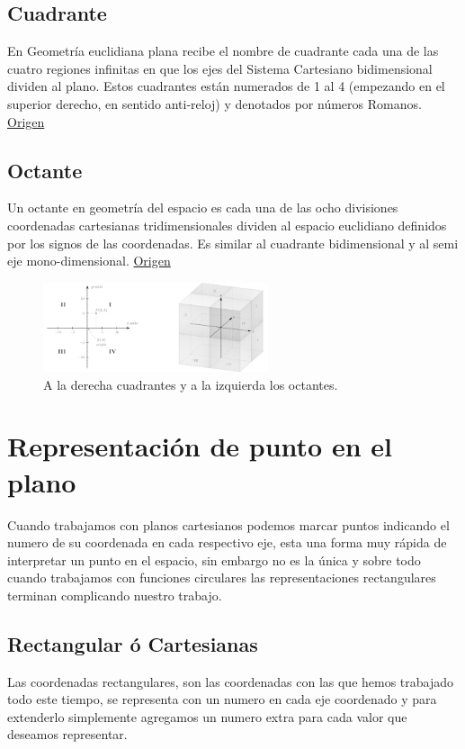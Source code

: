 \documentclass{article}
\begin{document}
\subsection{Cuadrante}
\label{sec:orge1b7409}
En Geometría euclidiana plana recibe el nombre de cuadrante cada una de las cuatro regiones infinitas en que los ejes del Sistema Cartesiano bidimensional dividen al plano. Estos cuadrantes están numerados de 1 al 4 (empezando en el superior derecho, en sentido anti-reloj) y denotados por números Romanos. \href{https://es.wikipedia.org/wiki/Cuadrante\_(geometr\%C3\%ADa)}{Origen}

\subsection{Octante}
\label{sec:orgcf0d150}
Un octante en geometría del espacio es cada una de las ocho divisiones coordenadas cartesianas tridimensionales dividen al espacio euclidiano definidos por los signos de las coordenadas. Es similar al cuadrante bidimensional y al semi eje mono-dimensional. \href{https://es.wikipedia.org/wiki/Octante\_(geometr\%C3\%ADa)}{Origen}

\begin{figure}[htbp]
\centering
\includegraphics[width=250px]{img/cuadrante-y-octante-2.png}
\caption{A la derecha cuadrantes y a la izquierda los octantes.}
\end{figure}


\section{Representación de punto en el plano}
\label{sec:org643a6e9}
Cuando trabajamos con planos cartesianos podemos marcar puntos indicando el numero de su coordenada en cada respectivo eje, esta una forma muy rápida de interpretar un punto en el espacio, sin embargo no es la única y sobre todo cuando trabajamos con funciones circulares las representaciones rectangulares terminan complicando nuestro trabajo.

\subsection{Rectangular ó Cartesianas}
\label{sec:org4a2d0ae}
Las coordenadas rectangulares, son las coordenadas con las que hemos trabajado todo este tiempo, se representa con un numero en cada eje coordenado y para extenderlo simplemente agregamos un numero extra para cada valor que deseamos representar. 
\end{document}
